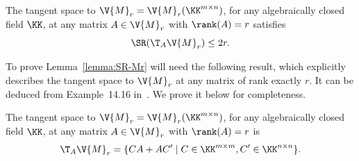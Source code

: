 \begin{lemma}\label{lemma:SR-Mr}
	The tangent space to $\V{M}_r=\V{M}_r(\KK^{m \times n})$, for any algebraically closed field $\KK$, at any matrix $A \in \V{M}_r$ with $\rank(A)=r$ satisfies
	$$\SR(\T_A \V{M}_r) \le 2r.$$
\end{lemma}
To prove Lemma~\ref{lemma:SR-Mr} will need the following result,
which explicitly describes the tangent space to $\V{M}_r$ at any matrix of rank exactly $r$. 
It can be deduced from Example~14.16 in~\cite{Harris}.
We prove it below for completeness.
\begin{proposition}\label{fact:tangent-matrices}
	The tangent space to $\V{M}_r=\V{M}_r(\KK^{m \times n})$, for any algebraically closed field $\KK$, at any matrix $A \in \V{M}_r$ with $\rank(A)=r$ is
	$$\T_A \V{M}_r = \{C A + A C' \mid C \in \KK^{m\times m}, C' \in \KK^{n \times n}\}.$$
\end{proposition}

